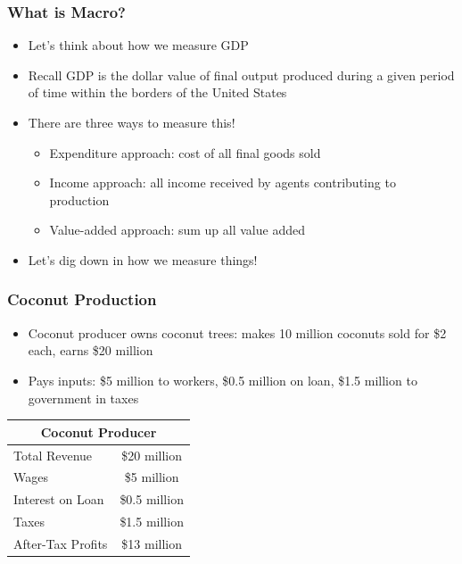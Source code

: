 \documentclass{beamer}
\author{Trevor S. Gallen}
\date{}
\begin{document}
\renewcommand*{\inserttotalframenumber}{\pageref{lastframe}}



\begin{frame}
\titlepage
\end{frame}

\begin{frame}
\frametitle[alignment=center]{What is Macro?}
\begin{itemize}
\item Let's think about how we measure GDP
\bigskip
\item Recall GDP is the dollar value of final output produced during a given period of time within the borders of the United States
\bigskip
\item There are three ways to measure this!
\begin{itemize}
\item Expenditure approach:  cost of all final goods sold
\item Income approach:  all income received by agents contributing to production
\item Value-added approach: sum up all value added 
\end{itemize}
\item Let's dig down in how we measure things!
\end{itemize}
\end{frame}

\begin{frame}
\frametitle[alignment=center]{Coconut Production}
\begin{itemize}
\item Coconut producer owns coconut trees: makes 10 million coconuts sold for \$2 each, earns \$20 million
\bigskip
\item Pays inputs:  \$5 million to workers, \$0.5 million on loan, \$1.5 million to government in taxes
\end{itemize}
\begin{table}
\begin{tabular}{lc}
\hline\hline
\multicolumn{2}{c}{Coconut Producer}\\
\hline
Total Revenue & \$20 million\\
Wages & \$5 million\\
Interest on Loan & \$0.5 million\\
Taxes & \$1.5 million\\
\hline
After-Tax Profits & \$13 million\\
\hline\hline
\end{tabular}
\end{table}
\end{frame}
\end{document}
